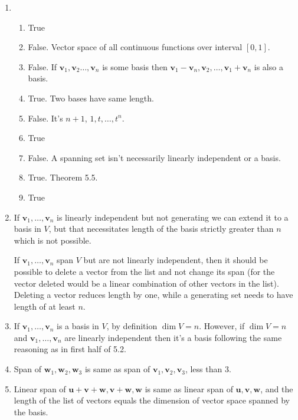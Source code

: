 \documentclass{article}
\newcommand{\vv}{\mathbf{v}}
\newcommand{\uu}{\mathbf{u}}
\newcommand{\ww}{\mathbf{w}}
\begin{document}
\begin{enumerate}[label=\textbf{5.\arabic*.}]
    \item \begin{enumerate}[label=\alph*)]
        \item True
        \item False. Vector space of all continuous functions over interval
        $[0, 1]$.
        \item False. If $\vv_1, \vv_2 \ldots, \vv_n$ is some basis then
        $\vv_1-\vv_n, \vv_2, \ldots, \vv_1+\vv_n$ is also a basis.
        \item True. Two bases have same length.
        \item False. It's $n+1$, $1, t, \ldots, t^n$.
        \item True
        \item False. A spanning set isn't necessarily linearly independent or a
        basis.
        \item True. Theorem 5.5.
        \item True
    \end{enumerate}
    
    \item If $\vv_1, \ldots, \vv_n$ is linearly independent but not generating
    we can extend it to a basis in $V$, but that necessitates length of
    the basis strictly greater than $n$ which is not possible.

    If $\vv_1, \ldots, \vv_n$ span $V$ but are not linearly independent,
    then it should be possible to delete a vector from the list and not change
    its span (for the vector deleted would be a linear combination of other
    vectors in the list). Deleting a vector reduces length by one, while
    a generating set needs to have length of at least $n$.

    \item If $\vv_1, \ldots, \vv_n$ is a basis in $V$, by definition $\dim V=n$.
    However, if $\dim V = n$ and $\vv_1, \ldots, \vv_n$ are linearly
    independent then it's a basis following the same reasoning as in first half
    of 5.2.

    \item Span of $\ww_1, \ww_2, \ww_3$ is same as span of
    $\vv_1, \vv_2, \vv_3$,
    less than 3.

    \item Linear span of $\uu + \vv + \ww, \vv + \ww, \ww$ is same as 
    linear span of $\uu, \vv, \ww$, and the length of the list of vectors equals
    the dimension of vector space spanned by the basis.


\end{enumerate}
\end{document}
